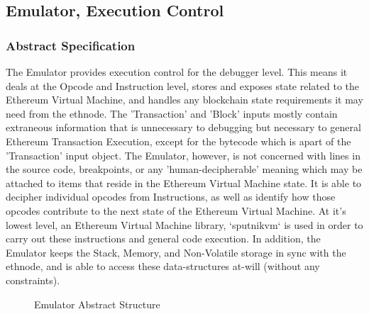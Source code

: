 \documentclass{report}
\begin{document}
\subsection{Emulator, Execution Control}

    \subsubsection{Abstract Specification}
        The Emulator provides execution control for the debugger level. This means it deals at the Opcode and Instruction level, stores and exposes state related to the Ethereum Virtual Machine, and handles any blockchain state requirements it may need from the \Gls{ethnode}. The 'Transaction' and 'Block' inputs mostly contain extraneous information that is unnecessary to debugging but necessary to general Ethereum Transaction Execution, except for the bytecode which is apart of the 'Transaction' input object. The Emulator, however, is not concerned with lines in the source code, breakpoints, or any 'human-decipherable' meaning which may be attached to items that reside in the Ethereum Virtual Machine state. It is able to decipher individual opcodes from Instructions, as well as identify how those opcodes contribute to the next state of the Ethereum Virtual Machine. At it's lowest level, an Ethereum Virtual Machine library, `sputnikvm` is used in order to carry out these instructions and general code execution. In addition, the Emulator keeps the Stack, Memory, and Non-Volatile storage in sync with the \Gls{ethnode}, and is able to access these data-structures at-will (without any constraints).
    \begin{figure}[!h]
        \caption{Emulator Abstract Structure}
    \end{figure}
\end{document}
